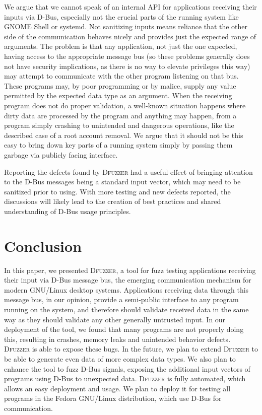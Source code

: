 \documentclass[conference]{IEEEtran}
\begin{document}
We argue that we cannot speak of an internal API for applications receiving
their inputs via D-Bus, especially not the crucial parts of the running system
like GNOME Shell or systemd. Not sanitizing inputs means reliance that the other
side of the communication behaves nicely and provides just the expected range of
arguments. The problem is that any application, not just the one expected,
having access to the appropriate message bus (so these problems generally does
not have security implications, as there is no way to elevate privileges this
way) may attempt to communicate with the other program listening on that bus.
These programs may, by poor programming or by malice, supply any value permitted by the expected data type as an argument.
When the receiving program does not do proper validation, a well-known situation
happens where dirty data are processed by the program and anything may happen,
from a program simply crashing to unintended and dangerous operations, like the
described case of a root account removal. We argue that it should not be this
easy to bring down key parts of a running system simply by passing them garbage
via publicly facing interface.

Reporting the defects found by \textsc{Dfuzzer} had a useful effect of bringing
attention to the D-Bus messages being a standard input vector, which may need to
be sanitized prior to using. With more testing and new defects reported, the
discussions will likely lead to the creation of best practices and shared
understanding of D-Bus usage principles.

\section{Conclusion}
In this paper, we presented \textsc{Dfuzzer}, a tool for fuzz testing
applications receiving their input via D-Bus message bus, the emerging
communication mechanism for modern GNU/Linux desktop systems. Applications
receiving data through this message bus, in our opinion, provide a semi-public
interface to any program running on the system, and therefore should validate
received data in the same way as they should validate any other generally
untrusted input. In our deployment of the tool, we found that many programs are
not properly doing this, resulting in crashes, memory leaks and unintended
behavior defects. \textsc{Dfuzzer} is able to expose these bugs.
In the future, we plan to extend \textsc{Dfuzzer} to be able to generate even
data of more complex data types. We also plan to enhance the tool to fuzz D-Bus signals, exposing the
additional input vectors of programs using D-Bus to unexpected data.
\textsc{Dfuzzer} is fully automated, which allows an easy deployment and usage.
We plan to deploy it for testing all programs in the Fedora GNU/Linux
distribution, which use D-Bus for communication.
\end{document}
